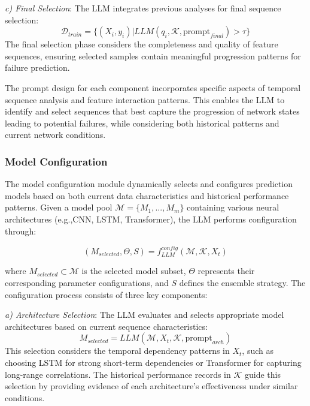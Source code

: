 \documentclass[conference]{IEEEtran}
\begin{document}
\textit{c) Final Selection}: The LLM integrates previous analyses for final sequence selection:
\begin{equation}
    \mathcal{D}_{train} = \{(X_i, y_i) | LLM(q_i, \mathcal{K}, \text{prompt}_{final}) > \tau\}
\end{equation}
The final selection phase considers the completeness and quality of feature sequences, ensuring selected samples contain meaningful progression patterns for failure prediction.

The prompt design for each component incorporates specific aspects of temporal sequence analysis and feature interaction patterns. This enables the LLM to identify and select sequences that best capture the progression of network states leading to potential failures, while considering both historical patterns and current network conditions.

\subsubsection{Model Configuration}
The model configuration module dynamically selects and configures prediction models based on both current data characteristics and historical performance patterns. Given a model pool $\mathcal{M} = \{M_1, ..., M_m\}$ containing various neural architectures (e.g.,CNN, LSTM, Transformer), the LLM performs configuration through:

\begin{equation}
    (M_{selected}, \Theta, S) = f_{LLM}^{config}(\mathcal{M}, \mathcal{K}, X_t)
\end{equation}

where $M_{selected} \subset \mathcal{M}$ is the selected model subset, $\Theta$ represents their corresponding parameter configurations, and $S$ defines the ensemble strategy. The configuration process consists of three key components:

\textit{a) Architecture Selection}: The LLM evaluates and selects appropriate model architectures based on current sequence characteristics:
\begin{equation}
    M_{selected} = LLM(\mathcal{M}, X_t, \mathcal{K}, \text{prompt}_{arch})
\end{equation}
This selection considers the temporal dependency patterns in $X_t$, such as choosing LSTM for strong short-term dependencies or Transformer for capturing long-range correlations. The historical performance records in $\mathcal{K}$ guide this selection by providing evidence of each architecture's effectiveness under similar conditions.
\end{document}
